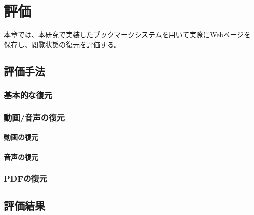 \chapter{評価}
\label{chap:evaluation}
本章では、本研究で実装したブックマークシステムを用いて実際にWebページを保存し、閲覧状態の復元を評価する。

\section{評価手法}

\subsection{基本的な復元}


\subsection{動画/音声の復元}
\subsubsection{動画の復元}

\subsubsection{音声の復元}


\subsection{PDFの復元}

\section{評価結果}
